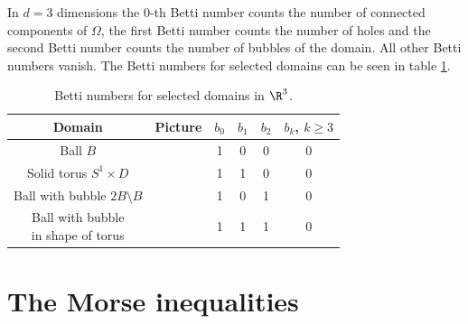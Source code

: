 \begin{example}[In spaceland]
  In $d=3$ dimensions the $0$-th Betti number counts the number of connected components
  of $\Omega$, the first Betti number counts the number of holes and the second Betti number
  counts the number of bubbles of the domain. All other Betti numbers vanish.
  The Betti numbers for selected domains can be seen in table \ref{tb:n3_domains_bettiNbrs}.
\end{example}

\begin{table}
  \centering
  \renewcommand{\arraystretch}{3}
  \begin{tabular}{c|c|c|c|c|c}
    Domain & Picture & $b_0$ & $b_1$ & $b_2$ & $b_k$, $k\geq3$ \\ \hline
    Ball $B$ & 
    \begin{minipage}{0.1\textwidth}
      \def\svgwidth{\textwidth}
      
    \end{minipage}
    & 1 & 0 & 0 & 0 \\
    Solid torus $S^1\times D$ & 
    \begin{minipage}{0.1\textwidth}
      \def\svgwidth{\textwidth}
      
    \end{minipage}
    & 1 & 1 & 0 & 0 \\
    Ball with bubble $2B\setminus B$ & 
    \begin{minipage}{0.1\textwidth}
      \def\svgwidth{\textwidth}
      
    \end{minipage}
    & 1 & 0 & 1 & 0 \\
    \makecell{Ball with bubble \\in shape of torus} & 
    \begin{minipage}{0.1\textwidth}
      \def\svgwidth{\textwidth}
      
    \end{minipage}
    & 1 & 1 & 1 & 0 \\
  \end{tabular}
  \caption{Betti numbers for selected domains in $\R^3$.}
  \label{tb:n3_domains_bettiNbrs}
\end{table}


\section{The Morse inequalities}

